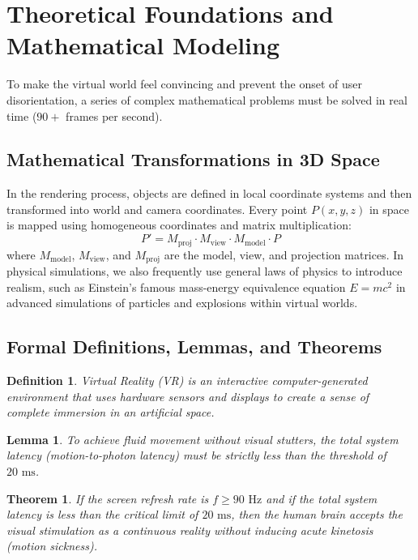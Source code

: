 \documentclass[12pt,a4paper]{article}
\newtheorem{teorema}{Theorem}[section]
\newtheorem{definicija}{Definition}[section]
\newtheorem{lema}{Lemma}[section]
\begin{document}
\section{Theoretical Foundations and Mathematical Modeling}

To make the virtual world feel convincing and prevent the onset of user disorientation, a series of complex mathematical problems must be solved in real time ($90+$ frames per second).

\subsection{Mathematical Transformations in 3D Space}

In the rendering process, objects are defined in local coordinate systems and then transformed into world and camera coordinates. Every point $P(x, y, z)$ in space is mapped using homogeneous coordinates and matrix multiplication:
\begin{equation}
    P' = M_{\text{proj}} \cdot M_{\text{view}} \cdot M_{\text{model}} \cdot P
\end{equation}
where $M_{\text{model}}$, $M_{\text{view}}$, and $M_{\text{proj}}$ are the model, view, and projection matrices. In physical simulations, we also frequently use general laws of physics to introduce realism, such as Einstein's famous mass-energy equivalence equation $E = mc^2$ in advanced simulations of particles and explosions within virtual worlds.

\subsection{Formal Definitions, Lemmas, and Theorems}

\begin{definicija}
Virtual Reality (VR) is an interactive computer-generated environment that uses hardware sensors and displays to create a sense of complete immersion in an artificial space.
\end{definicija}

\begin{lema}
To achieve fluid movement without visual stutters, the total system latency (motion-to-photon latency) must be strictly less than the threshold of $20 \text{ ms}$.
\end{lema}

\begin{teorema}
If the screen refresh rate is $f \ge 90 \text{ Hz}$ and if the total system latency is less than the critical limit of $20 \text{ ms}$, then the human brain accepts the visual stimulation as a continuous reality without inducing acute kinetosis (motion sickness).
\end{teorema}
\end{document}
